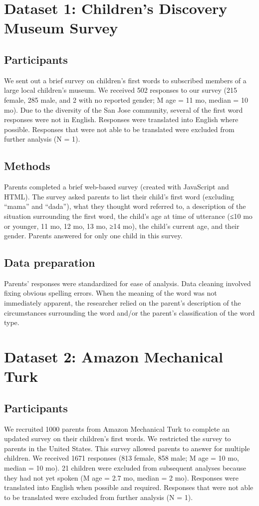 \documentclass[10pt,letterpaper]{article}
\begin{document}
\section{Dataset 1: Children's Discovery Museum Survey}

\subsection{Participants}
We sent out a brief survey on children’s first words to subscribed members of a large local children’s museum. We received 502 responses to our survey (215 female, 285 male, and 2 with no reported gender; M age = 11 mo, median = 10 mo). Due to the diversity of the San Jose community, several of the first word responses were not in English. Responses were translated into English where possible. Responses that were not able to be translated were excluded from further analysis (N = 1).

\subsection{Methods}
Parents completed a brief web-based survey (created with JavaScript and HTML). The survey asked parents to list their child’s first word (excluding “mama” and “dada”), what they thought word referred to, a description of the situation surrounding the first word, the child’s age at time of utterance (≤10 mo or younger, 11 mo, 12 mo, 13 mo, ≥14 mo), the child’s current age, and their gender. Parents answered for only one child in this survey.

\subsection{Data preparation}
Parents’ responses were standardized for ease of analysis. Data cleaning involved fixing obvious spelling errors. When the meaning of the word was not immediately apparent, the researcher relied on the parent’s description of the circumstances surrounding the word and/or the parent’s classification of the word type.

\section{Dataset 2: Amazon Mechanical Turk}

\subsection{Participants}
We recruited 1000 parents from Amazon Mechanical Turk to complete an updated survey on their children’s first words. We restricted the survey to parents in the United States. This survey allowed parents to answer for multiple children. We received 1671 responses (813 female, 858 male; M age = 10 mo, median = 10 mo). 21 children were excluded from subsequent analyses because they had not yet spoken (M age = 2.7 mo, median = 2 mo). Responses were translated into English when possible and required. Responses that were not able to be translated were excluded from further analysis (N = 1).
\end{document}
